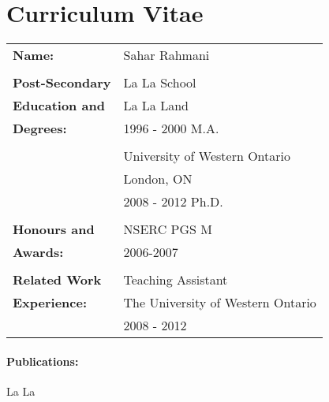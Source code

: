 \documentclass[12pt,twoside]{report}
\numberwithin{figure}{chapter}
\newcommand{\firstname}{Sahar}
\newcommand{\lastname}{Rahmani}
\begin{document}




{}

\begin{appendices}

\end{appendices}

\chapter*{Curriculum Vitae}
\begin{table}[ht]
\begin{tabular}{ll}
\textbf{Name:} & \firstname{} \lastname\\\\
\textbf{Post-Secondary} & La La School\\
\textbf{Education and}& La La Land\\
\textbf{Degrees:}& 1996 - 2000 M.A.\\\\
& University of Western Ontario\\
& London, ON\\
& 2008 - 2012 Ph.D.\\\\
\textbf{Honours and}& NSERC PGS M\\
\textbf{Awards:}& 2006-2007\\\\
\textbf{Related Work}& Teaching Assistant\\
\textbf{Experience:}& The University of Western Ontario\\
& 2008 - 2012\\
\end{tabular}
\end{table}
\subsubsection*{Publications:}
La La
\end{document}
